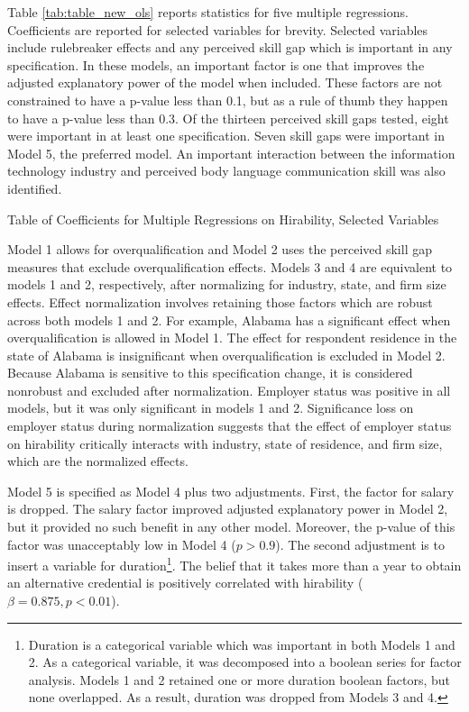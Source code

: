 \documentclass[review]{elsarticle}
\begin{document}

Table \ref{tab:table_new_ols} reports statistics for five multiple regressions.
Coefficients are reported for selected variables for brevity.
Selected variables include rulebreaker effects and any perceived skill gap which is important in any specification.
In these models, an important factor is one that improves the adjusted explanatory power of the model when included.
These factors are not constrained to have a p-value less than 0.1, but as a rule of thumb they happen to have a p-value less than 0.3.
Of the thirteen perceived skill gaps tested, eight were important in at least one specification.
Seven skill gaps were important in Model 5, the preferred model.
An important interaction between the information technology industry and perceived body language communication skill was also identified.

\begin{table}
    \caption{Table of Coefficients for Multiple Regressions on Hirability, Selected Variables}
    \resizebox{\columnwidth}{!}{
        
    }
    \label{tab:table_new_ols}
\end{table}

Model 1 allows for overqualification and Model 2 uses the perceived skill gap measures that exclude overqualification effects.
Models 3 and 4 are equivalent to models 1 and 2, respectively, after normalizing for industry, state, and firm size effects.
Effect normalization involves retaining those factors which are robust across both models 1 and 2.
For example, Alabama has a significant effect when overqualification is allowed in Model 1.
The effect for respondent residence in the state of Alabama is insignificant when overqualification is excluded in Model 2.
Because Alabama is sensitive to this specification change, it is considered nonrobust and excluded after normalization.
Employer status was positive in all models, but it was only significant in models 1 and 2.
Significance loss on employer status during normalization
suggests that the effect of employer status on hirability critically interacts with industry,
state of residence, and firm size, which are the normalized effects.

Model 5 is specified as Model 4 plus two adjustments.
First, the factor for salary is dropped.
The salary factor improved adjusted explanatory power in Model 2, but it provided no such benefit in any other model.
Moreover, the p-value of this factor was unacceptably low in Model 4 ($p > 0.9$).
The second adjustment is to insert a variable for duration\footnote{
    Duration is a categorical variable which was important in both Models 1 and 2.
    As a categorical variable, it was decomposed into a boolean series for factor analysis.
    Models 1 and 2 retained one or more duration boolean factors, but none overlapped.
    As a result, duration was dropped from Models 3 and 4.
}.
The belief that it takes more than a year to obtain an alternative credential
is positively correlated with hirability ($\beta = 0.875, p < 0.01$).
\end{document}
